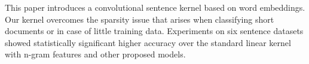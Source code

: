This paper introduces a convolutional sentence kernel based on word embeddings. Our kernel overcomes the sparsity issue that arises when classifying short documents or in case of little training data. Experiments on six sentence datasets showed statistically significant higher accuracy over the standard linear kernel with n-gram features and other proposed models.
